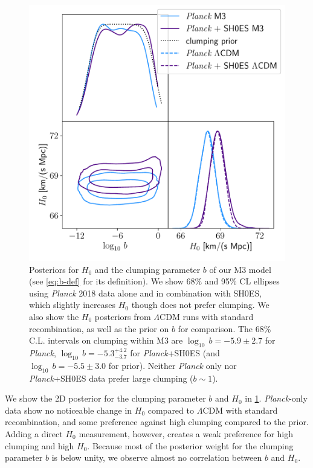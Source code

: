 \begin{figure}[ht!]
\includegraphics[width=\columnwidth]{img/planck-b-H0.pdf}
\caption[Posteriors for $H_0$ and the clumping parameter of our model]{Posteriors for $H_0$ and the clumping parameter $b$ of our M3 model (see \cref{eq:b-def} for its definition).
We show 68\% and 95\% CL ellipses using {\it Planck} 2018 data alone and in combination with SH0ES, which slightly increases $H_0$ though does not prefer clumping.
We also show the $H_0$ posteriors from $\Lambda$CDM runs with standard recombination, as well as the prior on $b$ for comparison.
The 68\% C.L. intervals on clumping within M3 are $\log_{10}\,b = -5.9\pm 2.7$ for {\it Planck}, $\log_{10}\,b = -5.3^{+4.2}_{-3.7}$ for {\it Planck}+SH0ES (and $\log_{10}\,b = -5.5\pm 3.0$ for prior).
Neither {\it Planck} only nor {\it Planck}+SH0ES data prefer large clumping ($b\sim 1$).}
\label{fig:planck-b-H0}
\end{figure}

We show the 2D posterior for the clumping parameter $b$ and $H_0$ in \cref{fig:planck-b-H0}. {\it Planck}-only data show no noticeable change in $H_0$ compared to $\Lambda$CDM with standard recombination, 
and some preference against high clumping compared to the prior.
Adding a direct $H_0$ measurement, however, creates a weak preference for high clumping and high $H_0$.
Because most of the posterior weight for the clumping parameter $b$ is below unity, we observe almost no correlation between $b$ and $H_0$.

